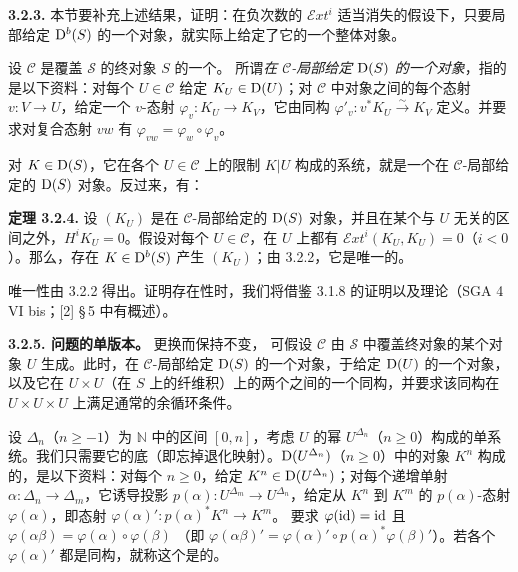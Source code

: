 \par\medskip\noindent\textbf{3.2.3.}
本节要补充上述结果，证明：在负次数的 $\mathcal E\!xt^i$ 适当消失的假设下，只要局部给定 $\mathrm{D}^b(S)$ 的一个对象，就实际上给定了它的一个整体对象。

设 $\mathscr C$ 是覆盖 $\mathscr S$ 的终对象 $S$ 的一个。
所谓\emph{在 $\mathscr C$-局部给定 $\mathrm{D}(S)$ 的一个对象}，指的是以下资料：对每个 $U\in\mathscr C$ 给定 $K_U\in\mathrm{D}(U)$；对 $\mathscr C$ 中对象之间的每个态射 $v:V\longrightarrow U$，给定一个 $v$-态射 $\varphi_v:K_U\longrightarrow K_V$，它由同构
$\varphi'_v:v^*K_U\xrightarrow{\sim}K_V$ 定义。并要求对复合态射 $vw$ 有
$\varphi_{vw}=\varphi_w\circ\varphi_v$。

对 $K\in\mathrm{D}(S)$，它在各个 $U\in\mathscr C$ 上的限制 $K|U$ 构成的系统，就是一个在 $\mathscr C$-局部给定的 $\mathrm{D}(S)$ 对象。反过来，有：

\par\medskip\noindent\textbf{定理 3.2.4.}
设 $(K_U)$ 是在 $\mathscr C$-局部给定的 $\mathrm{D}(S)$ 对象，并且在某个与 $U$ 无关的区间之外，$H^iK_U=0$。假设对每个 $U\in\mathscr C$，在 $U$ 上都有
$\mathcal E\!xt^i(K_U,K_U)=0$（$i<0$）。那么，存在 $K\in\mathrm{D}^b(S)$ 产生 $(K_U)$；由 3.2.2，它是唯一的。

唯一性由 3.2.2 得出。证明存在性时，我们将借鉴 3.1.8 的证明以及理论（SGA 4 VI bis；[2] \S\,5 中有概述）。

\par\medskip\noindent\textbf{3.2.5. 问题的单版本。}
更换而保持不变，
可假设 $\mathscr C$ 由 $\mathscr S$ 中覆盖终对象的某个对象 $U$ 生成。此时，在 $\mathscr C$-局部给定 $\mathrm{D}(S)$ 的一个对象，于给定 $\mathrm{D}(U)$ 的一个对象，以及它在 $U\times U$（在 $S$ 上的纤维积）上的两个之间的一个同构，并要求该同构在 $U\times U\times U$ 上满足通常的余循环条件。

设 $\Delta_n$（$n\geq-1$）为 $\mathbb N$ 中的区间 $[0,n]$，考虑 $U$ 的幂 $U^{\Delta_n}$（$n\geq0$）构成的单系统。我们只需要它的底（即忘掉退化映射）。$\mathrm{D}(U^{\Delta_n})$（$n\geq0$）中的对象 $K^n$ 构成的，是以下资料：对每个 $n\geq0$，给定 $K^n\in\mathrm{D}(U^{\Delta_n})$；对每个递增单射 $\alpha:\Delta_n\longrightarrow\Delta_m$，它诱导投影
$p(\alpha):U^{\Delta_m}\longrightarrow U^{\Delta_n}$，给定从 $K^n$ 到 $K^m$ 的 $p(\alpha)$-态射 $\varphi(\alpha)$，即态射
$\varphi(\alpha)':p(\alpha)^*K^n\longrightarrow K^m$。
要求 $\varphi(\operatorname{id})=\operatorname{id}$ 且
$\varphi(\alpha\beta)=\varphi(\alpha)\circ\varphi(\beta)$
（即 $\varphi(\alpha\beta)'=\varphi(\alpha)'\circ p(\alpha)^*\varphi(\beta)'$）。若各个 $\varphi(\alpha)'$ 都是同构，就称这个是的。

